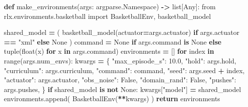 \documentclass[
  chinese,
  11pt,
  letterpaper,
]{article}
\newenvironment{Shaded}{\begin{snugshade}}{\end{snugshade}}
\newcommand{\BuiltInTok}[1]{#1}
\newcommand{\ControlFlowTok}[1]{\textcolor[rgb]{0.13,0.29,0.53}{\textbf{#1}}}
\newcommand{\FloatTok}[1]{\textcolor[rgb]{0.00,0.00,0.81}{#1}}
\newcommand{\ImportTok}[1]{#1}
\newcommand{\KeywordTok}[1]{\textcolor[rgb]{0.13,0.29,0.53}{\textbf{#1}}}
\newcommand{\NormalTok}[1]{#1}
\newcommand{\OperatorTok}[1]{\textcolor[rgb]{0.81,0.36,0.00}{\textbf{#1}}}
\newcommand{\StringTok}[1]{\textcolor[rgb]{0.31,0.60,0.02}{#1}}
\newcommand{\VariableTok}[1]{\textcolor[rgb]{0.00,0.00,0.00}{#1}}
\renewenvironment{Shaded}{\par\smallskip}{\par\smallskip}
\begin{document}
\begin{Shaded}
\begin{Highlighting}[]
\KeywordTok{def}\NormalTok{ make\_environments(args: argparse.Namespace) }\OperatorTok{{-}\textgreater{}} \BuiltInTok{list}\NormalTok{[Any]:}
    \ImportTok{from}\NormalTok{ rlx.environments.basketball }\ImportTok{import}\NormalTok{ BasketballEnv, basketball\_model}

\NormalTok{    shared\_model }\OperatorTok{=}\NormalTok{ (}
\NormalTok{        basketball\_model(actuator}\OperatorTok{=}\NormalTok{args.actuator) }\ControlFlowTok{if}\NormalTok{ args.actuator }\OperatorTok{==} \StringTok{"xml"} \ControlFlowTok{else} \VariableTok{None}
\NormalTok{    )}
\NormalTok{    command }\OperatorTok{=} \VariableTok{None} \ControlFlowTok{if}\NormalTok{ args.command }\KeywordTok{is} \VariableTok{None} \ControlFlowTok{else} \BuiltInTok{tuple}\NormalTok{(}\BuiltInTok{float}\NormalTok{(x) }\ControlFlowTok{for}\NormalTok{ x }\KeywordTok{in}\NormalTok{ args.command)}
\NormalTok{    environments }\OperatorTok{=}\NormalTok{ []}
    \ControlFlowTok{for}\NormalTok{ index }\KeywordTok{in} \BuiltInTok{range}\NormalTok{(args.num\_envs):}
\NormalTok{        kwargs }\OperatorTok{=}\NormalTok{ \{}
            \StringTok{"max\_episode\_s"}\NormalTok{: }\FloatTok{10.0}\NormalTok{,}
            \StringTok{"hold"}\NormalTok{: args.hold,}
            \StringTok{"curriculum"}\NormalTok{: args.curriculum,}
            \StringTok{"command"}\NormalTok{: command,}
            \StringTok{"seed"}\NormalTok{: args.seed }\OperatorTok{+}\NormalTok{ index,}
            \StringTok{"actuator"}\NormalTok{: args.actuator,}
            \StringTok{"obs\_noise"}\NormalTok{: }\VariableTok{False}\NormalTok{,}
            \StringTok{"domain\_rand"}\NormalTok{: }\VariableTok{False}\NormalTok{,}
            \StringTok{"pushes"}\NormalTok{: args.pushes,}
\NormalTok{        \}}
        \ControlFlowTok{if}\NormalTok{ shared\_model }\KeywordTok{is} \KeywordTok{not} \VariableTok{None}\NormalTok{:}
\NormalTok{            kwargs[}\StringTok{"model"}\NormalTok{] }\OperatorTok{=}\NormalTok{ shared\_model}
\NormalTok{        environments.append(}
\NormalTok{            BasketballEnv(}\OperatorTok{**}\NormalTok{kwargs)}
\NormalTok{        )}
    \ControlFlowTok{return}\NormalTok{ environments}



\end{Highlighting}
\end{Shaded}
\end{document}
